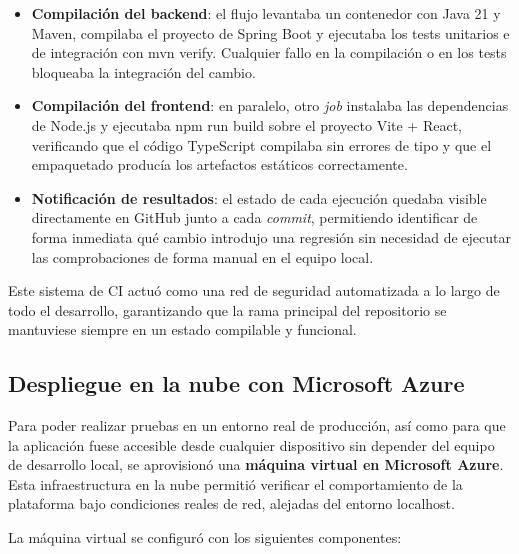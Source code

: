 \begin{itemize}
    \item \textbf{Compilación del backend}: el flujo levantaba un contenedor con Java 21 y Maven, compilaba el proyecto de Spring Boot y ejecutaba los tests unitarios e de integración con mvn verify. Cualquier fallo en la compilación o en los tests bloqueaba la integración del cambio.
    \item \textbf{Compilación del frontend}: en paralelo, otro \emph{job} instalaba las dependencias de Node.js y ejecutaba npm run build sobre el proyecto Vite + React, verificando que el código TypeScript compilaba sin errores de tipo y que el empaquetado producía los artefactos estáticos correctamente.
    \item \textbf{Notificación de resultados}: el estado de cada ejecución quedaba visible directamente en GitHub junto a cada \emph{commit}, permitiendo identificar de forma inmediata qué cambio introdujo una regresión sin necesidad de ejecutar las comprobaciones de forma manual en el equipo local.
\end{itemize}

Este sistema de CI actuó como una red de seguridad automatizada a lo largo de todo el desarrollo, garantizando que la rama principal del repositorio se mantuviese siempre en un estado compilable y funcional.

\subsection{Despliegue en la nube con Microsoft Azure}

Para poder realizar pruebas en un entorno real de producción, así como para que la aplicación fuese accesible desde cualquier dispositivo sin depender del equipo de desarrollo local, se aprovisionó una \textbf{máquina virtual en Microsoft Azure}. Esta infraestructura en la nube permitió verificar el comportamiento de la plataforma bajo condiciones reales de red, alejadas del entorno localhost.

La máquina virtual se configuró con los siguientes componentes:

